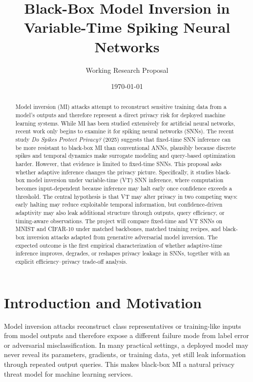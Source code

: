 \documentclass[11pt]{article}
\title{Black-Box Model Inversion in Variable-Time Spiking Neural Networks}
\author{Working Research Proposal}
\date{\today}
\begin{document}
\maketitle

\begin{abstract}
Model inversion (MI) attacks attempt to reconstruct sensitive training data from a model's outputs and therefore represent a direct privacy risk for deployed machine learning systems. While MI has been studied extensively for artificial neural networks, recent work only begins to examine it for spiking neural networks (SNNs). The recent study \textit{Do Spikes Protect Privacy?} (2025) suggests that fixed-time SNN inference can be more resistant to black-box MI than conventional ANNs, plausibly because discrete spikes and temporal dynamics make surrogate modeling and query-based optimization harder. However, that evidence is limited to fixed-time SNNs. This proposal asks whether adaptive inference changes the privacy picture. Specifically, it studies black-box model inversion under variable-time (VT) SNN inference, where computation becomes input-dependent because inference may halt early once confidence exceeds a threshold. The central hypothesis is that VT may alter privacy in two competing ways: early halting may reduce exploitable temporal information, but confidence-driven adaptivity may also leak additional structure through outputs, query efficiency, or timing-aware observations. The project will compare fixed-time and VT SNNs on MNIST and CIFAR-10 under matched backbones, matched training recipes, and black-box inversion attacks adapted from generative adversarial model inversion. The expected outcome is the first empirical characterization of whether adaptive-time inference improves, degrades, or reshapes privacy leakage in SNNs, together with an explicit efficiency--privacy trade-off analysis.
\end{abstract}

\section{Introduction and Motivation}
Model inversion attacks reconstruct class representatives or training-like inputs from model outputs and therefore expose a different failure mode from label error or adversarial misclassification. In many practical settings, a deployed model may never reveal its parameters, gradients, or training data, yet still leak information through repeated output queries. This makes black-box MI a natural privacy threat model for machine learning services.
\end{document}
